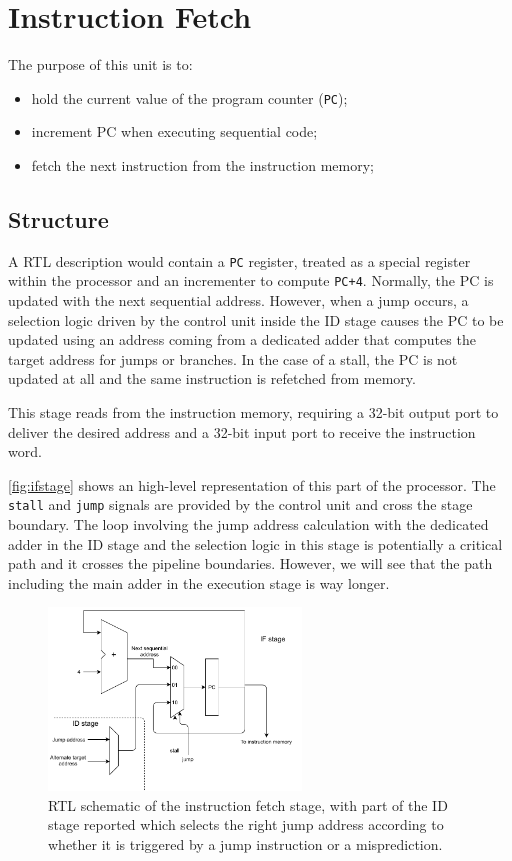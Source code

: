 \section{Instruction Fetch}
The purpose of this unit is to:
\begin{itemize}
	\item hold the current value of the program counter (\texttt{PC}); 
	\item increment PC when executing sequential code;
	\item fetch the next instruction from the instruction memory;
\end{itemize}

\subsection{Structure} A RTL description would contain a \texttt{PC} register, treated as a special register within the processor and an incrementer to compute \texttt{PC+4}. Normally, the PC is updated with the next sequential address. However, when a jump occurs, a selection logic driven by the control unit inside the ID stage causes the PC to be updated using an address coming from a dedicated adder that computes the target address for jumps or branches. In the case of a stall, the PC is not updated at all and the same instruction is refetched from memory.

This stage reads from the instruction memory, requiring a 32-bit output port to deliver the desired address and a 32-bit input port to receive the instruction word. 

\autoref{fig:ifstage} shows an high-level representation of this part of the processor. The \texttt{stall} and \texttt{jump} signals are provided by the control unit and cross the stage boundary. The loop involving the jump address calculation with the dedicated adder in the ID stage and the selection logic in this stage is potentially a critical path and it crosses the pipeline boundaries. However, we will see that the path including the main adder in the execution stage is way longer.

\begin{figure}[h]
	\centering
	\includegraphics[width=0.6\textwidth]{../images/IF.pdf}
	\caption{RTL schematic of the instruction fetch stage, with part of the ID stage reported which selects the right jump address according to whether it is triggered by a jump instruction or a misprediction.}
	\label{fig:ifstage}
\end{figure}